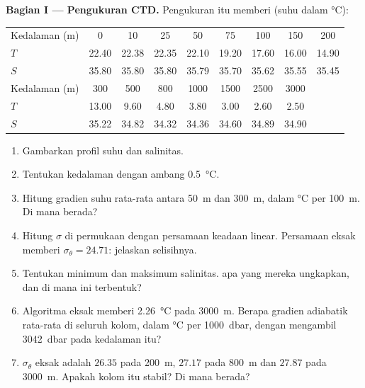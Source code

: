 \begin{problem}
\medskip
\noindent\textbf{Bagian I --- Pengukuran CTD.} Pengukuran itu memberi (suhu dalam
\si{\celsius}):
\begin{center}
\small
\setlength{\tabcolsep}{3pt}
\begin{tabular}{|l|*{8}{c}|}
\hline
Kedalaman (m) & 0 & 10 & 25 & 50 & 75 & 100 & 150 & 200 \\
$T$ & 22.40 & 22.38 & 22.35 & 22.10 & 19.20 & 17.60 & 16.00 & 14.90 \\
$S$ & 35.80 & 35.80 & 35.80 & 35.79 & 35.70 & 35.62 & 35.55 & 35.45 \\
\hline
Kedalaman (m) & 300 & 500 & 800 & 1000 & 1500 & 2500 & 3000 & \\
$T$ & 13.00 & 9.60 & 4.80 & 3.80 & 3.00 & 2.60 & 2.50 & \\
$S$ & 35.22 & 34.82 & 34.32 & 34.36 & 34.60 & 34.89 & 34.90 & \\
\hline
\end{tabular}
\end{center}
\begin{enumerate}
  \item Gambarkan profil suhu dan salinitas.
  \item Tentukan kedalaman  dengan ambang \qty{0.5}{\celsius}.
  \item Hitung gradien suhu rata-rata antara \qty{50}{m} dan \qty{300}{m}, dalam
        \si{\celsius} per \qty{100}{m}. Di mana  berada?
  \item Hitung $\sigma$ di permukaan dengan persamaan keadaan linear. Persamaan eksak
        memberi $\sigma_\theta = 24.71$: jelaskan selisihnya.
  \item Tentukan minimum dan maksimum salinitas.  apa yang mereka ungkapkan,
        dan di mana ini terbentuk?
  \item Algoritma eksak memberi  \qty{2.26}{\celsius} pada \qty{3000}{m}.
        Berapa gradien adiabatik rata-rata di seluruh kolom, dalam \si{\celsius} per
        \qty{1000}{dbar}, dengan mengambil \qty{3042}{dbar} pada kedalaman itu?
  \item $\sigma_\theta$ eksak adalah $26.35$ pada \qty{200}{m}, $27.17$ pada
        \qty{800}{m} dan $27.87$ pada \qty{3000}{m}. Apakah kolom itu stabil? Di mana
         berada?
\end{enumerate}


\end{problem}
